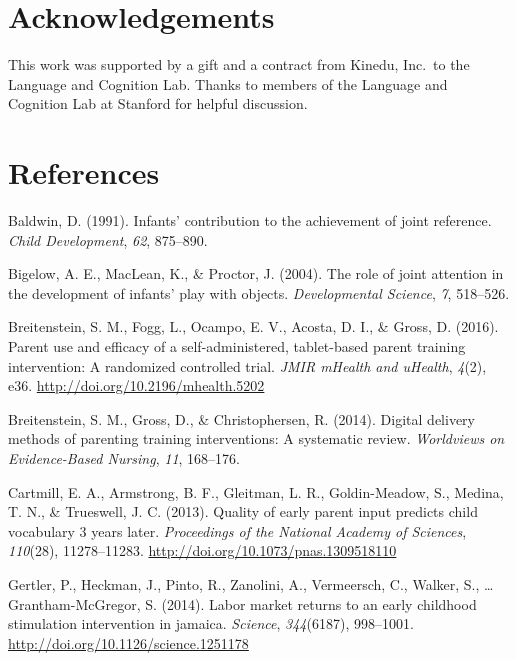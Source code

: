 \documentclass[man,floatsintext]{apa6}
\begin{document}
\hypertarget{acknowledgements}{%
\section{Acknowledgements}\label{acknowledgements}}

This work was supported by a gift and a contract from Kinedu, Inc.~to the Language and Cognition Lab.
Thanks to members of the Language and Cognition Lab at Stanford for helpful discussion.

\newpage

\hypertarget{references}{%
\section{References}\label{references}}

\begingroup
\setlength{\parindent}{-0.5in}
\setlength{\leftskip}{0.5in}

\hypertarget{refs}{}
\leavevmode\hypertarget{ref-Baldwin1991}{}%
Baldwin, D. (1991). Infants' contribution to the achievement of joint reference. \emph{Child Development}, \emph{62}, 875--890.

\leavevmode\hypertarget{ref-Bigelow2004}{}%
Bigelow, A. E., MacLean, K., \& Proctor, J. (2004). The role of joint attention in the development of infants' play with objects. \emph{Developmental Science}, \emph{7}, 518--526.

\leavevmode\hypertarget{ref-Breitenstein2016}{}%
Breitenstein, S. M., Fogg, L., Ocampo, E. V., Acosta, D. I., \& Gross, D. (2016). Parent use and efficacy of a self-administered, tablet-based parent training intervention: A randomized controlled trial. \emph{JMIR mHealth and uHealth}, \emph{4}(2), e36. \url{http://doi.org/10.2196/mhealth.5202}

\leavevmode\hypertarget{ref-Breitenstein2014}{}%
Breitenstein, S. M., Gross, D., \& Christophersen, R. (2014). Digital delivery methods of parenting training interventions: A systematic review. \emph{Worldviews on Evidence-Based Nursing}, \emph{11}, 168--176.

\leavevmode\hypertarget{ref-Cartmill2013}{}%
Cartmill, E. A., Armstrong, B. F., Gleitman, L. R., Goldin-Meadow, S., Medina, T. N., \& Trueswell, J. C. (2013). Quality of early parent input predicts child vocabulary 3 years later. \emph{Proceedings of the National Academy of Sciences}, \emph{110}(28), 11278--11283. \url{http://doi.org/10.1073/pnas.1309518110}

\leavevmode\hypertarget{ref-Jamaica2014}{}%
Gertler, P., Heckman, J., Pinto, R., Zanolini, A., Vermeersch, C., Walker, S., \ldots{} Grantham-McGregor, S. (2014). Labor market returns to an early childhood stimulation intervention in jamaica. \emph{Science}, \emph{344}(6187), 998--1001. \url{http://doi.org/10.1126/science.1251178}
\end{document}
